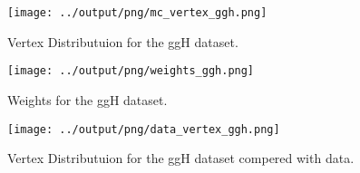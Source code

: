 \documentclass[11pt]{book}
\begin{document}
\begin{figure}[htb]
\centering
\texttt{[image: ../output/png/mc\_vertex\_ggh.png]}
\caption{Vertex Distributuion for the ggH dataset.}
\label{fig:mc_vertex_ggh}
\end{figure}

\begin{figure}[htb]
\centering
\texttt{[image: ../output/png/weights\_ggh.png]}
\caption{Weights for the ggH dataset.}
\label{fig:weight_ggh}
\end{figure}

\begin{figure}[htb]
\centering
\texttt{[image: ../output/png/data\_vertex\_ggh.png]}
\caption{Vertex Distributuion for the ggH dataset compered with data.}
\label{fig:data_vertex_ggh}
\end{figure}
\end{document}
